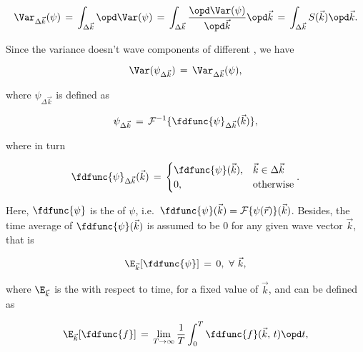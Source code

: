 {\begin{equation} \label{eq:variance_k_eta}
\Var_{\Delta\vec{k}}(\psi) \,=\, \int_{\Delta\vec{k}}\opd \Var(\psi) \,=\, \int_{\Delta\vec{k}}\frac{\opd \Var(\psi)}{\opd\vec{k}}\opd\vec{k} \,=\, \int_{\Delta\vec{k}}S(\vec{k})\opd\vec{k}.
\end{equation}

Since the variance doesn't \correlate wave components of different \wavelengths, we have

\begin{equation} \label{eq:variance_k_eta_to_variance_eta_k}
\Var(\psi_{\Delta\vec{k}}) \,=\, \Var_{\Delta\vec{k}}(\psi),
\end{equation}

where $\psi_{\Delta\vec{k}}$ is defined as

\begin{equation} \label{eq:eta_k_of_fd_eta_k}
\psi_{\Delta\vec{k}} \,=\, \mathcal{F}^{-1}\{\fdfunc{\psi}_{\Delta\vec{k}}(\vec{k})\},
\end{equation}

where in turn

\begin{equation} \label{eq:fd_eta_delta_k_definition}
\fdfunc{\psi}_{\Delta\vec{k}}(\vec{k}) \,=\, \begin{cases}
\fdfunc{\psi}(\vec{k}), & \vec{k} \in \Delta\vec{k} \\
0, & \text{otherwise}
\end{cases}.
\end{equation}

Here, $\fdfunc{\psi}$ is the  of $\psi$, i.e.\ $\fdfunc{\psi}(\vec{k}) = \mathcal{F}\{\psi(\vec{r})\}(\vec{k})$. Besides, the time average of $\fdfunc{\psi}(\vec{k})$ is assumed to be 0 for any given wave vector $\vec{k}$, that is

\begin{equation} \label{eq:zero_expectation_value_reciprocal_space}
\E_{\vec{k}}[\fdfunc{\psi}] \,=\, 0,\ \forall\ \vec{k},
\end{equation}

where $\E_{\vec{k}}$ is the  with respect to time, for a fixed value of $\vec{k}$, and can be defined as

\begin{equation} \label{eq:expectation_value_reciprocal_space_with_regard_to_t_definition}
\E_{\vec{k}}[\fdfunc{f}] \,=\, \lim_{T\to\infty}\frac{1}{T}\int_0^T \fdfunc{f}(\vec{k},\,t)\opd t,
\end{equation}

}
